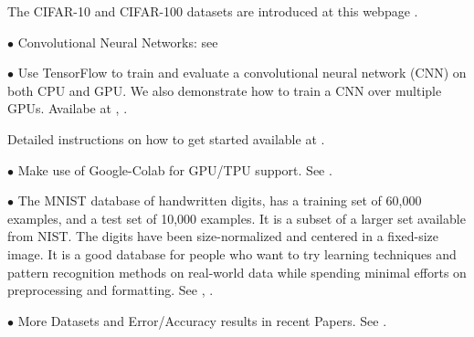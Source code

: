 The CIFAR-10 and CIFAR-100 datasets are introduced at this webpage \cite{CIFAR10}.


$\bullet$ Convolutional Neural Networks: see \cite{ConvolutionalNN}



$\bullet$ Use TensorFlow to train and evaluate a convolutional neural network (CNN) on both CPU and GPU. We also demonstrate how to train a CNN over multiple GPUs. Availabe at \cite{GPUTraining1}, \cite{GPUTraining2}.

Detailed instructions on how to get started available at \cite{GPUTraining3}.



$\bullet$ Make use of Google-Colab for GPU/TPU support. See \cite{Google-Colab}.

$\bullet$ The MNIST database of handwritten digits, has a training set of 60,000 examples, and a test set of 10,000 examples. It is a subset of a larger set available from NIST. The digits have been size-normalized and centered in a fixed-size image.
It is a good database for people who want to try learning techniques and pattern recognition methods on real-world data while spending minimal efforts on preprocessing and formatting. See \cite{MNIST1}, \cite{MNIST2}.

$\bullet$ More Datasets and Error/Accuracy results in recent Papers. See \cite{MoreDataSets}.
